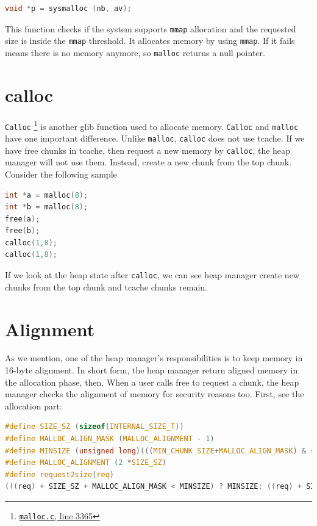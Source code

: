 \documentclass{masterthesis}
\newcommand*\tch{tcache}
\newcommand*\mallocc{\lstinline{malloc}\xspace}
\newcommand*\callocc{\lstinline{calloc}\xspace}
\newcommand*\mmapc{\lstinline{mmap}\xspace}
\newcommand*\Callocc{\lstinline{Calloc}\xspace}
\begin{document}
\begin{lstlisting}[language=c,frame=tlrb]
 void *p = sysmalloc (nb, av);
 \end{lstlisting}

This function checks if the system supports \mmapc{} allocation and the requested size is inside the \mmapc{} threshold. It allocates memory by using \mmapc{}. If it fails means there is no memory anymore, so \mallocc{} returns a null pointer.

\section{calloc}
\label{sect:calloc}
\Callocc{} \footnote{\href{https://sourceware.org/git/?p=glibc.git;a=blob;f=malloc/malloc.c;h=f7cd29bc2f93e1082ee77800bd64a4b2a2897055;hb=9ea3686266dca3f004ba874745a4087a89682617\#l3365}{\texttt{malloc.c}, line 3365}} is another glib function used to allocate memory. \Callocc{} and \mallocc{} have one important difference. Unlike \mallocc{}, \callocc{} does not use \tch{}. If we have free chunks in \tch{}, then request a new memory by \callocc{}, the heap manager will not use them. Instead, create a new chunk from the top chunk. Consider the following sample

\begin{lstlisting}[language=c,frame=tlrb]
int *a = malloc(8);
int *b = malloc(8);
free(a);
free(b);
calloc(1,8);
calloc(1,8);
\end{lstlisting}

If we look at the heap state after \callocc{}, we can see heap manager create new chunks from the top chunk and \tch{} chunks remain.

\section{Alignment}
\label{sect:alignment}
As we mention, one of the heap manager's responsibilities is to keep memory in 16-byte alignment. In short form, the heap manager return aligned memory in the allocation phase, then, When a user calls free to request a chunk, the heap manager checks the alignment of memory for security reasons too. First, see the allocation part:

\begin{lstlisting}[language=c,frame=tlrb]
#define SIZE_SZ (sizeof(INTERNAL_SIZE_T))
#define MALLOC_ALIGN_MASK (MALLOC_ALIGNMENT - 1)
#define MINSIZE (unsigned long)(((MIN_CHUNK_SIZE+MALLOC_ALIGN_MASK) & ~MALLOC_ALIGN_MASK))
#define MALLOC_ALIGNMENT (2 *SIZE_SZ)
#define request2size(req)
(((req) + SIZE_SZ + MALLOC_ALIGN_MASK < MINSIZE) ? MINSIZE: ((req) + SIZE_SZ + MALLOC_ALIGN_MASK) & ~MALLOC_ALIGN_MASK)
\end{lstlisting}
\end{document}
